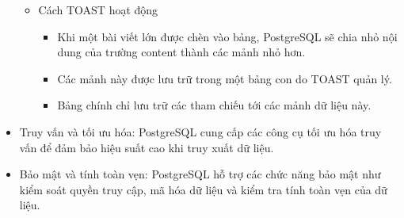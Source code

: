 \begin{itemize}
\begin{figure}[H]
    \end{figure}
        \begin{itemize}
            \item Cách TOAST hoạt động
                \begin{itemize}
                    \item Khi một bài viết lớn được chèn vào bảng, PostgreSQL sẽ chia nhỏ nội dung của trường content thành các mảnh nhỏ hơn.
                    \item Các mảnh này được lưu trữ trong một bảng con do TOAST quản lý.
                    \item Bảng chính chỉ lưu trữ các tham chiếu tới các mảnh dữ liệu này.
                \end{itemize}
        \end{itemize}
    \item Truy vấn và tối ưu hóa: PostgreSQL cung cấp các công cụ tối ưu hóa truy vấn để đảm bảo hiệu suất cao khi truy xuất dữ liệu.
    \item Bảo mật và tính toàn vẹn: PostgreSQL hỗ trợ các chức năng bảo mật như kiểm soát quyền truy cập, mã hóa dữ liệu và kiểm tra tính toàn vẹn của dữ liệu.
\end{itemize}


